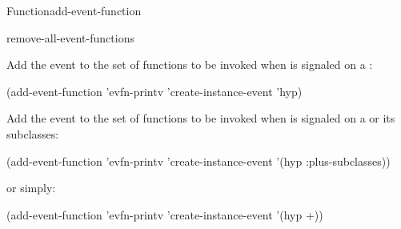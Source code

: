 \documentclass[10pt,twoside,english,pdftex]{article}
\begin{document}
\begin{functiondoc}{Function}{add-event-function}
\begin{alsos}{remove-all-event-functions}
\end{alsos}

\fnexamples
{}%
Add the event   to the set of functions
to be invoked when  is signaled on a
 :
%
\W\supp
\begin{example}
  (add-event-function 'evfn-printv 'create-instance-event 'hyp)
\end{example}
%
Add the event   to the set of functions
to be invoked when  is signaled on a
  or its subclasses:
%
\W\supp\notpretop
\begin{example}
  (add-event-function 'evfn-printv 'create-instance-event '(hyp :plus-subclasses))
\end{example}
%
or simply:
%
\W\supp\notpretop
\begin{example}
  (add-event-function 'evfn-printv 'create-instance-event '(hyp +))
\end{example}

\fnnote
\instanceevfnsnyi

\end{functiondoc}

\end{document}
